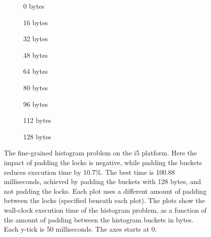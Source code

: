 \begin{figure}[hbpt]
	\graphicspath{{plots/}}
	\begin{subfigure}{0.32\textwidth}
		
		\caption{0 bytes}
	\end{subfigure}
	\begin{subfigure}{0.32\textwidth}
		
		\caption{16 bytes}
	\end{subfigure}
	\begin{subfigure}{0.32\textwidth}
		
		\caption{32 bytes}
	\end{subfigure}
	\begin{subfigure}{0.32\textwidth}
		
		\caption{48 bytes}
	\end{subfigure}
	\begin{subfigure}{0.32\textwidth}
		
		\caption{64 bytes}
	\end{subfigure}
	\begin{subfigure}{0.32\textwidth}
		
		\caption{80 bytes}
	\end{subfigure}
	\begin{subfigure}{0.33\textwidth}
		
		\caption{96 bytes}
	\end{subfigure}
	\begin{subfigure}{0.33\textwidth}
		
		\caption{112 bytes}
	\end{subfigure}
	\begin{subfigure}{0.32\textwidth}
		
		\caption{128 bytes}
	\end{subfigure}
	\caption{The fine-grained histogram problem on the i5 platform. Here the impact of
	padding the locks is negative, while padding the buckets reduces
	execution time by 10.7\%. The best time is 100.88 milliseconds, achieved by
	padding the buckets with 128 bytes, and not padding the locks.
	Each plot uses a different amount of padding between the locks
	(specified beneath each plot). The plots show the wall-clock execution time of the
	histogram problem, as a function of the amount of padding between the
	histogram buckets in bytes. Each y-tick is 50 milliseconds. The axes
	starts at 0.}
	\label{fig:histo-local-i5}
\end{figure}

